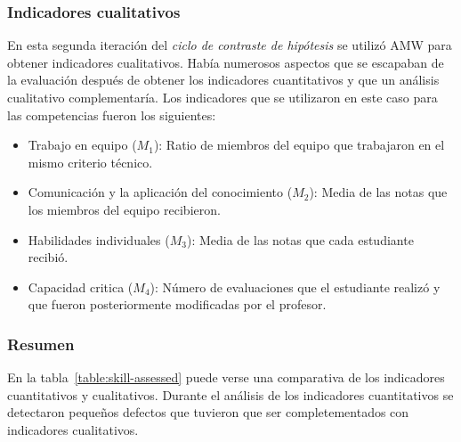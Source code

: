 \subsubsection{Indicadores cualitativos}

En esta segunda iteración del \emph{ciclo de contraste de hipótesis} se utilizó AMW para obtener indicadores cualitativos. Había numerosos aspectos que se escapaban de la evaluación después de obtener los indicadores cuantitativos y que un análisis cualitativo complementaría. Los indicadores que se utilizaron en este caso para las competencias fueron los siguientes:

\begin{itemize}
	\item Trabajo en equipo ($M_1$): Ratio de miembros del equipo que trabajaron en el mismo criterio técnico.
	\item Comunicación y la aplicación del conocimiento ($M_2$): Media de las notas que los miembros del equipo recibieron.
	\item Habilidades individuales ($M_3$): Media de las notas que cada estudiante recibió.
	\item Capacidad critica ($M_4$): Número de evaluaciones que el estudiante realizó y que fueron posteriormente modificadas por el profesor.
\end{itemize}

\subsubsection{Resumen}

En la tabla~\ref{table:skill-assessed} puede verse una comparativa de los indicadores cuantitativos y cualitativos. Durante el análisis de los indicadores cuantitativos se detectaron pequeños defectos que tuvieron que ser completementados con indicadores cualitativos. 

